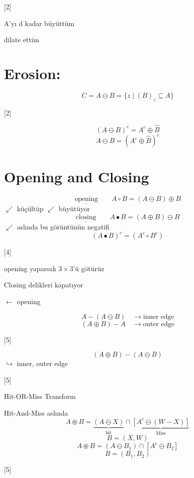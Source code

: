 \documentclass[11pt,a4paper]{article}
\begin{document}
[2]

A'yı d kadar büyüttüm

dilate ettim

\section{Erosion:}
\[ C = A \ominus B = \{z \mid (B)_z \subseteq A\} \]

[2]

\[ (A \ominus B)^c = A^c \oplus \hat{B} \]
\[ A \ominus B = (A^c \oplus \hat{B})^c \]


\section{Opening and Closing}
\[ \underline{\text{opening}} \qquad A \circ B = (A \ominus B) \oplus B \]
$\swarrow$ küçültüp \qquad $\swarrow$ büyütüyor
\[ \underline{\text{closing}} \qquad A \bullet B = (A \oplus B) \ominus B \]
$\swarrow$ aslında bu görüntünün negatifi
\[ (A \bullet B)^c = (A^c \circ B^c) \]

[4]

opening yaparsak $3\times 3$'ü götürüz

Closing delikleri kapatıyor

$\leftarrow$ opening

\[ A - (A \ominus B) \quad \rightarrow \text{inner edge} \]
\[ (A \oplus B) - A \quad \rightarrow \text{outer edge} \]

[5]

\[ (A \oplus B) - (A \ominus B) \]
$\hookrightarrow$ inner, outer edge

[5]

Hit-OR-Miss Transform

Hit-And-Miss aslında
\[ A \circledast B = \underbrace{(A \ominus X)}_{\text{hit}} \cap \underbrace{[A^c \ominus (W-X)]}_{\text{Miss}} \]
\[ B = (X, W) \]
\[ A \circledast B = (A \ominus B_1) \cap [A^c \ominus B_2] \]
\[ B = (B_1, B_2) \]

[5]
\end{document}
